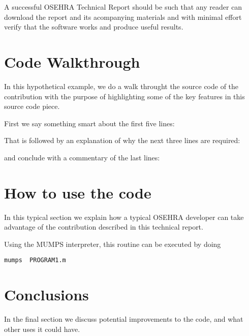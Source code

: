 \documentclass{OSEHRAArticle}
\newcommand{\lstlistingwithnumber}[3]{
\begin{center}

\end{center}
}
\begin{document}
A successful OSEHRA Technical Report should be such that any reader can download
the report and its acompanying materials and with minimal effort verify that the
software works and produce useful results.

\section{Code Walkthrough}

In this hypothetical example, we do a walk throught the source code of the
contribution with the purpose of highlighting some of the key features in this
source code piece.

First we say something smart about the first five lines:

\lstlistingwithnumber{1}{5}{PROGRAM1.m}

That is followed by an explanation of why the next three lines are required:

\lstlistingwithnumber{6}{9}{PROGRAM1.m}

and conclude with a commentary of the last lines:

\lstlistingwithnumber{10}{14}{PROGRAM1.m}



\section{How to use the code}

In this typical section we explain how a typical OSEHRA developer can take
advantage of the contribution described in this technical report.

Using the MUMPS interpreter, this routine can be executed by doing

\begin{verbatim}
mumps  PROGRAM1.m
\end{verbatim}


\section{Conclusions}

In the final section we discuss potential improvements to the code, and what
other uses it could have.


%
%



\end{document}
